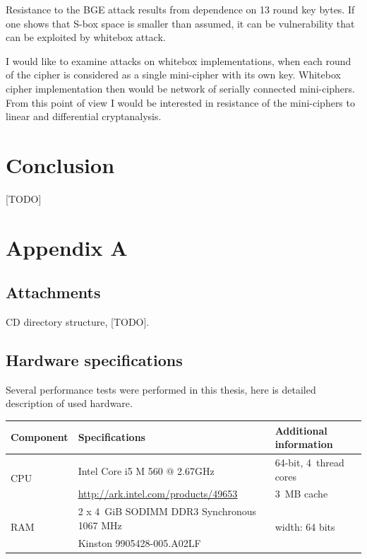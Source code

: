 \documentclass[11pt,oneside,final]{fithesis2}
\begin{document}
    Resistance to the BGE attack results from dependence on 13 round key bytes. If one shows that S-box space is smaller than assumed, it can be vulnerability 
    that can be exploited by whitebox attack. 

    I would like to examine attacks on whitebox implementations, when each round of the cipher is considered as a single mini-cipher with its own key. Whitebox
    cipher implementation then would be network of serially connected mini-ciphers. From this point of view I would be interested in resistance of the mini-ciphers
    to linear and differential cryptanalysis. 

\chapter{Conclusion}\label{sec:conclusion}   
    [TODO]
    
\appendix

\chapter{Appendix A}
    \section{Attachments}\label{appendix:attach}
    CD directory structure, [TODO].
    
    
    \section{Hardware specifications}\label{appendix:hw_spec}
    Several performance tests were performed in this thesis, here is detailed description of used hardware.
    
    \begin{center}
    \begin{table}[ht]
    \begin{tabular}{ l | l | l }
	\hline
	Component & Specifications & Additional information \\
	\hline
	\hline
	\multirow{2}{*}{CPU} & Intel\textsuperscript{\textregistered} Core\textsuperscript{\texttrademark} i5 M 560 @ 2.67GHz & 64-bit, 4~thread cores  \\
	                     & \url{http://ark.intel.com/products/49653}                                                      & 3~MB cache              \\ \hline
	\multirow{2}{*}{RAM} & 2 x 4~GiB SODIMM DDR3 Synchronous 1067 MHz                                                     & \multirow{2}{*}{width: 64 bits}    \\
	                     & Kinston 9905428-005.A02LF                                                                      &    \\ \hline
    \end{tabular}
    \end{table}
    \end{center}
    
\end{document}

